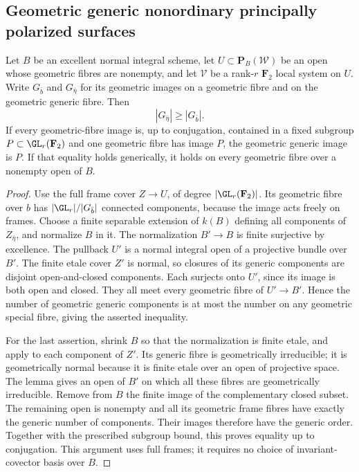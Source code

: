 \subsection{Geometric generic nonordinary principally polarized surfaces}
\label{subsec:generic-nonordinary-ppav-groups-candidate}

\begin{lemma}
\label{lem:frame-components-specialization-candidate}
Let $B$ be an excellent normal integral scheme, let
$U\subset\mathbf P_B(\mathcal W)$ be an open whose geometric
fibres are nonempty, and let $\mathcal V$ be a rank-$r$
$\mathbf F_2$ local system on $U$. Write $G_{\bar b}$ and
$G_{\bar\eta}$ for its geometric images on a geometric fibre
and on the geometric generic fibre. Then
\[
                         |G_{\bar\eta}|\ge |G_{\bar b}|.
\]
If every geometric-fibre image is, up to conjugation, contained
in a fixed subgroup $P\subset\GL_r(\mathbf F_2)$ and one
geometric fibre has image $P$, the geometric generic image is
$P$. If that equality holds generically, it holds on every
geometric fibre over a nonempty open of $B$.
\end{lemma}

\begin{proof}
Use the full frame cover $Z\to U$, of degree
$|\GL_r(\mathbf F_2)|$. Its geometric fibre over $b$ has
$|\GL_r|/|G_{\bar b}|$ connected components, because the
image acts freely on frames. Choose a finite separable
extension of $k(B)$ defining all components of
$Z_{\bar\eta}$, and normalize $B$ in it. The normalization
$B'\to B$ is finite surjective by excellence. The pullback
$U'$ is a normal integral open of a projective bundle over
$B'$. The finite etale cover $Z'$ is normal, so closures of
its generic components are disjoint open-and-closed
components. Each surjects onto $U'$, since its image is both
open and closed. They all meet every geometric fibre of
$U'\to B'$. Hence the number of geometric generic components
is at most the number on any geometric special fibre,
giving the asserted inequality.

For the last assertion, shrink $B$ so that the normalization
is finite etale, and apply
\cite[Lemma~37.27.5]{Stacks0559} to each component of $Z'$.
Its generic fibre is geometrically irreducible; it is
geometrically normal because it is finite etale over an open
of projective space. The lemma gives an open of $B'$ on
which all these fibres are geometrically irreducible.
Remove from $B$ the finite image of the complementary
closed subset. The remaining open is nonempty and all its
geometric frame fibres have exactly the generic number of
components. Their images therefore have the generic order.
Together with the prescribed subgroup bound, this proves
equality up to conjugation. This argument uses full frames;
it requires no choice of invariant-covector basis over $B$.
\end{proof}

